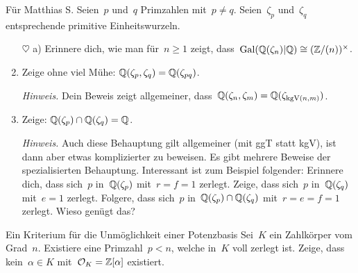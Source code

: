 \documentclass{uebblatt}
\begin{document}
\begin{aufgabe}{Für Matthias S.}
Seien~$p$ und~$q$ Primzahlen mit~$p \neq q$. Seien~$\zeta_p$ und~$\zeta_q$
entsprechende primitive Einheitswurzeln.
\begin{enumerate}
\item[$\heartsuit$ a)] Erinnere dich, wie man für~$n \geq 1$ zeigt,
dass~$\mathrm{Gal}(\mathbb{Q}(\zeta_n)|\mathbb{Q}) \cong (\mathbb{Z}/(n))^\times$.
\addtocounter{enumi}{1}

\item Zeige ohne viel Mühe: $\mathbb{Q}(\zeta_p, \zeta_q) = \mathbb{Q}(\zeta_{pq})$.

{\tiny\emph{Hinweis.} Dein Beweis zeigt allgemeiner, dass~$\mathbb{Q}(\zeta_n,
\zeta_m) = \mathbb{Q}(\zeta_{\operatorname{kgV}(n,m)})$.\par}
\item Zeige: $\mathbb{Q}(\zeta_p) \cap \mathbb{Q}(\zeta_q) = \mathbb{Q}$.

{\tiny\emph{Hinweis.} Auch diese Behauptung gilt allgemeiner (mit ggT statt
kgV), ist dann aber etwas komplizierter zu beweisen. Es gibt mehrere Beweise
der spezialisierten Behauptung. Interessant ist zum Beispiel folgender:
Erinnere dich, dass sich~$p$ in~$\mathbb{Q}(\zeta_p)$ mit~$r = f = 1$ zerlegt. Zeige,
dass sich~$p$ in~$\mathbb{Q}(\zeta_q)$ mit~$e = 1$ zerlegt. Folgere, dass sich~$p$
in~$\mathbb{Q}(\zeta_p) \cap \mathbb{Q}(\zeta_q)$ mit~$r = e = f = 1$ zerlegt. Wieso genügt
das?\par}
\end{enumerate}
\end{aufgabe}

\begin{aufgabe}{Ein Kriterium für die Unmöglichkeit einer Potenzbasis}
Sei~$K$ ein Zahlkörper vom Grad~$n$. Existiere eine Primzahl~$p < n$, welche
in~$K$ voll zerlegt ist. Zeige, dass kein~$\alpha \in K$ mit~$\mathcal{O}_K =
\mathbb{Z}[\alpha]$ existiert.
\end{aufgabe}
\end{document}
